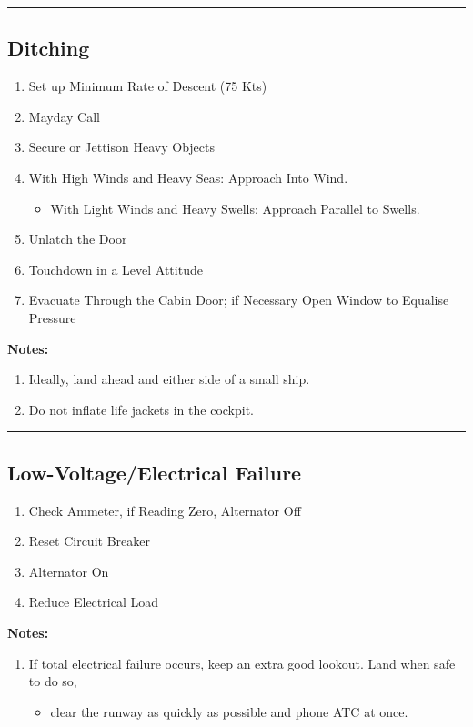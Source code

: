 \documentclass[a4paper]{article}
\newenvironment{checklist}{
  \begin{itemize}[leftmargin=*, align=left]
    \setlength{\itemsep}{2pt}
    \setlength{\parskip}{0pt}
    \setlength{\parsep}{0pt}
}{
  \end{itemize}
}
\newenvironment{numberedchecklist}{
  \begin{enumerate}[label=\arabic*., leftmargin=*, align=left]
    \setlength{\itemsep}{2pt}
    \setlength{\parskip}{0pt}
    \setlength{\parsep}{0pt}
}{
  \end{enumerate}
}
\begin{document}
\rule{\linewidth}{0.4pt}

\subsection*{Ditching}
\begin{numberedchecklist}
\item Set up Minimum Rate of Descent (75 Kts)
\item Mayday Call
\item Secure or Jettison Heavy Objects
\item With High Winds and Heavy Seas: Approach Into Wind.
  \begin{checklist}
  \item With Light Winds and Heavy Swells: Approach Parallel to Swells.
  \end{checklist}
\item Unlatch the Door
\item Touchdown in a Level Attitude
\item Evacuate Through the Cabin Door; if Necessary Open Window to Equalise Pressure
\end{numberedchecklist}

\textbf{Notes:}
\begin{numberedchecklist}
\item Ideally, land ahead and either side of a small ship.
\item Do not inflate life jackets in the cockpit.
\end{numberedchecklist}

\rule{\linewidth}{0.4pt}

\subsection*{Low-Voltage/Electrical Failure}
\begin{numberedchecklist}
\item Check Ammeter, if Reading Zero, Alternator Off
\item Reset Circuit Breaker
\item Alternator On
\item Reduce Electrical Load
\end{numberedchecklist}

\textbf{Notes:}
\begin{numberedchecklist}
\item If total electrical failure occurs, keep an extra good lookout. Land when safe to do so,
  \begin{checklist}
  \item clear the runway as quickly as possible and phone ATC at once.
  \end{checklist}
\end{numberedchecklist}
\end{document}
